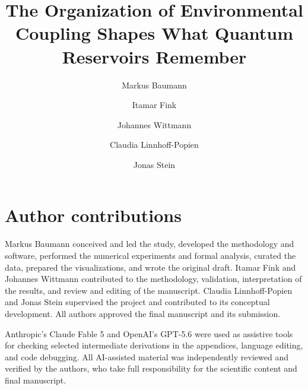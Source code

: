 \documentclass[a4paper,twocolumn,11pt,unpublished]{quantumarticle}
\begin{document}
\title{The Organization of Environmental Coupling Shapes What Quantum Reservoirs Remember}

\author[qar,mobile]{Markus Baumann}
\author[mobile]{Itamar Fink}
\author[mobile]{Johannes Wittmann}
\author[qar,mobile]{Claudia Linnhoff-Popien}
\author[qar,mobile]{Jonas Stein}


\maketitle









\section*{Author contributions}
Markus Baumann conceived and led the study, developed the methodology and software,
performed the numerical experiments and formal analysis, curated the data, prepared
the visualizations, and wrote the original draft. Itamar Fink and Johannes Wittmann
contributed to the methodology, validation, interpretation of the results, and review
and editing of the manuscript. Claudia Linnhoff-Popien and Jonas Stein supervised the
project and contributed to its conceptual development. All authors approved the
final manuscript and its submission.

Anthropic's Claude Fable 5 and OpenAI's \mbox{GPT-5.6} were used as assistive tools for
checking selected intermediate derivations in the appendices, language editing, and
code debugging. All AI-assisted material was independently reviewed and verified by
the authors, who take full responsibility for the scientific content and final manuscript.

\begingroup
\fontsize{9.5pt}{11.2pt}\selectfont


\endgroup

\clearpage
\onecolumn

\end{document}

